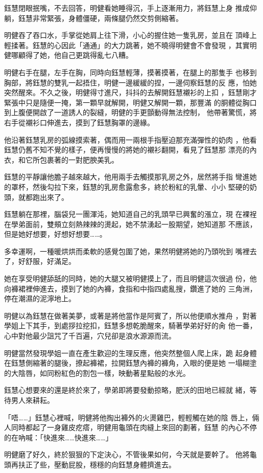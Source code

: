 鈺慧閉眼抿嘴，不去回答，明健看她睡得沉，手上逐漸用力，將鈺慧上身
推成仰躺，鈺慧非常緊張，身體僵硬，兩條腿仍然交剪側縮著。

明健吞了吞口水，手掌從她肩上往下滑，小心的握住她一隻乳房，並且在
頂峰上輕揉著。鈺慧的心因此「通通」的大力跳著，她不曉得明健會不會發現
，其實明健哪顧得了她，他自己更跳得亂七八糟。

明健右手在腿，左手在胸，同時向鈺慧輕薄，摸著摸著，在腿上的那隻手
也移到胸部，將鈺慧的雙乳一起捂住，明健一邊緩緩的捏，一邊伺察鈺慧的反
應，怕她突然醒來。不久之後，明健得寸進尺，抖抖的去解開鈺慧襯衫的上扣
，鈺慧剛才緊張中只是隨便一掩，第一顆早就解開，明健又解開一顆，那豐滿
的胴體從胸口到上腹便開啟了一道誘人的裂縫，明健的手更顫動得無法控制，
他帶著驚慌，將右手從襯衫口伸進去，摸到了鈺慧胸罩的邊緣。

他沿著鈺慧乳房的弧線摸索著，偶而用一兩根手指壓迫那充滿彈性的奶肉
，他看鈺慧仍舊不知不覺的樣子，便再慢慢的將她的襯衫翻開，看見了鈺慧那
漂亮的內衣，和它所包裹著的一對肥腴美乳。

鈺慧的平靜讓他膽子越來越大，他用兩手去觸摸那乳房之外，居然將手指
彎進她的罩杯，然後勾拉下來，鈺慧的乳房愈露愈多，終於粉紅的乳暈、小小
堅硬的奶頭，就都跑出來了。

鈺慧躺在那裡，腦袋兒一團渾沌，她知道自己的乳頭早已興奮的漲立，現
在裸裎在學弟面前，雙頰立刻熱辣辣的燙起，她不禁湧起一股期望，她知道那
不應該，但是她好想要，好想好想要……。

多幸運啊，一種暖烘烘而柔軟的感覺包圍了她，果然明健將她的乃頭吮到
嘴裡去了，好舒服，好滿足。

她在享受明健舔舐的同時，她的大腿又被明健摸上了，而且明健這次很過
份，他向褲裙裡伸進去，摸到了她的內褲，食指和中指四處亂搜，鑽進了她的
三角洲，停在潮濕的泥濘地上。

明健以為鈺慧在做著美夢，或著是將他當作是阿賓了，所以他便順水推舟
，對著學姐上下其手，到處拶拉挖扣，鈺慧多想乾脆醒來，騎著學弟好好的肏
他一番，心中對他最少詛咒了千百遍，穴兒卻是浪水源源而流。

明健當然發現學姐一直在產生歡迎的生理反應，他突然整個人爬上床，跪
起身體在鈺慧側縮著的腿後，撩起褲裙，拉開鈺慧內褲的褲角，入眼的便是她
一塌糊塗的大陰唇，如同粉紅色的割包一樣，映動著星點般的水光。

鈺慧心想要來的還是終於來了，學弟即將要發動掠略，肥沃的田地已經就
緒，等待男人來耕耘。

「唔……」鈺慧心裡喊，明健將他掏出褲外的火燙雞巴，輕輕觸在她的陰
唇上，倆人同時都起了一身雞皮疙瘩，明健用龜頭在肉縫上來回的劃著，鈺慧
的內心不停的在吶喊：「快進來……快進來……」

明健磨了好久，終於狠狠的下定決心，不管後果如何，今天就是要幹了。
他將龜頭再扶正了些，壓動屁股，穩穩的向鈺慧身體擠進去。

